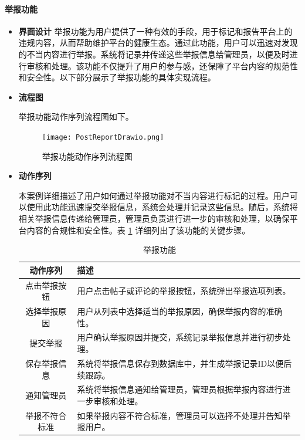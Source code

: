 \paragraph{举报功能}

\begin{itemize}
	\item \textbf{界面设计}
	举报功能为用户提供了一种有效的手段，用于标记和报告平台上的违规内容，从而帮助维护平台的健康生态。通过此功能，用户可以迅速对发现的不当内容进行举报。系统将记录并传递这些举报信息给管理员，以便及时进行审核和处理。该功能不仅提升了用户的参与感，还保障了平台内容的规范性和安全性。以下部分展示了举报功能的具体实现流程。
	
	\item \textbf{流程图}
	
	举报功能动作序列流程图如下。
	
	\begin{figure}[H]
		\centering
		\texttt{[image: PostReportDrawio.png]} 
		\caption{举报功能动作序列流程图}
		\label{fig:post-report.drawio}
	\end{figure}
	
	\item \textbf{动作序列}
	
	本案例详细描述了用户如何通过举报功能对不当内容进行标记的过程。用户可以使用此功能迅速提交举报信息，系统会处理并记录这些信息。随后，系统将相关举报信息传递给管理员，管理员负责进行进一步的审核和处理，以确保平台内容的合规性和安全性。表 \ref{table:post-report} 详细列出了该功能的关键步骤。
	
	\begin{table}[H]
		\centering
		\caption{举报功能}
		\renewcommand\arraystretch{1.5}
		\begin{tabular}{|c|>{\raggedright\arraybackslash}p{8cm}|}
			\hline
			\textbf{动作序列} & \textbf{描述} \\ \hline
			点击举报按钮 & 用户点击帖子或评论的举报按钮，系统弹出举报选项列表。 \\ \hline
			选择举报原因 & 用户从列表中选择适当的举报原因，确保举报内容的准确性。 \\ \hline
			提交举报 & 用户确认举报原因并提交，系统记录举报信息并进行初步处理。 \\ \hline
			保存举报信息 & 系统将举报信息保存到数据库中，并生成举报记录ID以便后续跟踪。 \\ \hline
			通知管理员 & 系统将举报信息通知给管理员，管理员根据举报内容进行进一步审核和处理。 \\ \hline
			举报不符合标准 & 如果举报内容不符合标准，管理员可以选择不处理并告知举报用户。 \\ \hline
		\end{tabular}
		\label{table:post-report}
	\end{table}
	

\end{itemize}
